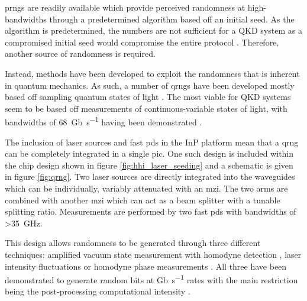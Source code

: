 \Acp{prng} are readily available which provide perceived randomness at high-bandwidths through a predetermined algorithm based off an initial seed. As the algorithm is predetermined, the numbers are not sufficient for a \ac{QKD} system as a compromised initial seed would compromise the entire protocol \cite{Bouda2012Weak, li2015randomness}. Therefore, another source of randomness is required.

Instead, methods have been developed to exploit the randomness that is inherent in quantum mechanics. As such, a number of \acp{qrng} have been developed mostly based off sampling quantum states of light \cite{Herrero-Collantes2017Quantum}. The most viable for \ac{QKD} systems seem to be based off measurements of continuous-variable states of light, with bandwidths of \SI{68}{Gb\per\second} having been demonstrated \cite{nie2015generation}.



The inclusion of laser sources and fast \acp{pd} in the \ac{InP} platform mean that a \ac{qrng} can be completely integrated in a single \ac{pic}. One such design is included within the chip design shown in figure \ref{fig:hhi_laser_seeding} and a schematic is given in figure \ref{fig:qrng}. Two laser sources are directly integrated into the waveguides which can be individually, variably attenuated with an \ac{mzi}. The two arms are combined with another \ac{mzi} which can act as a beam splitter with a tunable splitting ratio. Measurements are performed by two fast \acp{pd} with bandwidths of \SI{>35}{GHz}. 

This design allows randomness to be generated through three different techniques: amplified vacuum state measurement with homodyne detection \cite{gabriel2010generator, zheng20196}, laser intensity fluctuations \cite{raffaelli2018generation} or homodyne phase measurements \cite{xu2012ultrafast}. All three have been demonstrated to generate random bits at \si{Gb\per\second} rates with the main restriction being the post-processing computational intensity \cite{Herrero-Collantes2017Quantum}.

